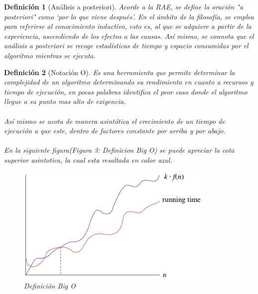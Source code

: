 \documentclass[12pt,twoside]{article}
\newtheorem{defi}{Definición}
\begin{document}
\begin{defi}[Análisis a posteriori]
Acorde a la RAE, se define la oraci\'on "a posteriori" como  ‘por lo que viene después’. En el ámbito de la filosofía, se emplea para referirse al conocimiento inductivo, esto es, al que se adquiere a partir de la experiencia, ascendiendo de los efectos a las causas.
Así mismo, se connota que el an\'alisis a posteriori se recoge estadísticas de tiempo y espacio consumidas por el algoritmo mientras se ejecuta. 

\end{defi}
\begin{defi}[Notaci\'on O]
Es una herramienta que permite determinar la complejidad de un algoritmo determinando su rendimiento en cuanto a recursos y tiempo de ejecución, en pocas palabras identifica el peor caso donde el algoritmo llegue a su punto mas alto de exigencia.
\\
\\
Así mismo se acota de manera asintótica el crecimiento de un tiempo de ejecución a que este, dentro de factores constante por arriba y por abajo.
\\
\\
En la siguiente figura(Figura 3: Definicion Big O) se puede apreciar la cota superior asintotica, la cual esta resaltada en color azul. 
\begin{figure}[h!]
\centering
\includegraphics[scale=1.5]{big o.png}
\caption{Definici\'on Big O}
\label{fig:universe}
\end{figure}
\end{defi}
\clearpage
\end{document}
